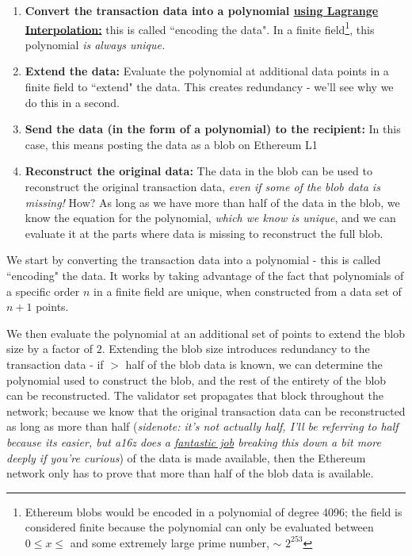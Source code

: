 \documentclass[12pt]{article}
\begin{document}
\begin{enumerate}
    \item \textbf{Convert the transaction data into a polynomial \href{https://www.youtube.com/watch?v=bzp_q7NDdd4}{using Lagrange Interpolation:}} this is called ``encoding the data". In a finite field\footnote{Ethereum blobs would be encoded in a polynomial of degree 4096; the field is considered finite because the polynomial can only be evaluated between $0 \leq x \leq$ and some extremely large prime number, $\sim$ $2^{253}$}, this polynomial \textit{is always unique.}
    \item \textbf{Extend the data:} Evaluate the polynomial at additional data points in a finite field to ``extend" the data. This creates redundancy - we'll see why we do this in a second. 
    \item \textbf{Send the data (in the form of a polynomial) to the recipient:} In this case, this means posting the data as a blob on Ethereum L1
    \item \textbf{Reconstruct the original data:} The data in the blob can be used to reconstruct the original transaction data, \textit{even if some of the blob data is missing!} How? As long as we have more than half of the data in the blob, we know the equation for the polynomial, \textit{which we know is unique}, and we can evaluate it at the parts where data is missing to reconstruct the full blob. 
\end{enumerate}

We start by converting the transaction data into a polynomial - this is called ``encoding" the data. It works by taking advantage of the fact that polynomials of a specific order $n$ in a finite field are unique, when constructed from a data set of $n+1$ points. 

We then evaluate the polynomial at an additional set of points to extend the blob size by a factor of $2$. Extending the blob size introduces redundancy to the transaction data - if $>$ half of the blob data is known, we can determine the polynomial used to construct the blob, and the rest of the entirety of the blob can be reconstructed. The validator set propagates that block throughout the network; because we know that the original transaction data can be reconstructed as long as more than half (\textit{sidenote: it's not actually half, I'll be referring to half because its easier, but a16z does a \href{https://a16zcrypto.com/posts/article/an-overview-of-danksharding-and-a-proposal-for-improvement-of-das/}{fantastic job} breaking this down a bit more deeply if you're curious}) of the data is made available, then the Ethereum network only has to prove that more than half of the blob data is available.  
\end{document}
